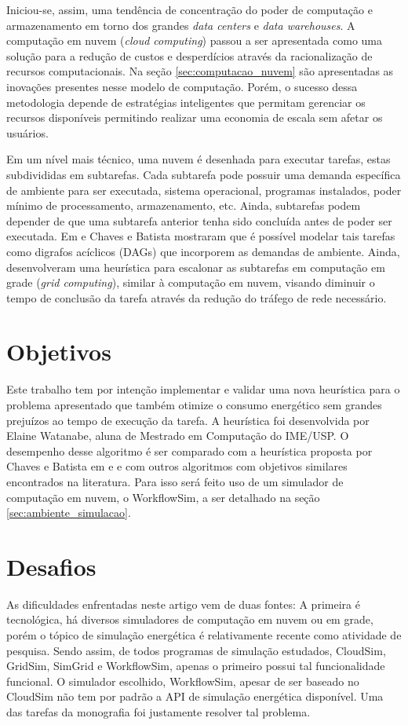 Iniciou-se, assim, uma tendência de concentração do poder de computação e 
armazenamento em torno dos grandes \emph{data centers} e \emph{data warehouses}.
A computação em nuvem (\emph{cloud computing}) passou a ser apresentada como
uma solução para a redução de custos e desperdícios através da
racionalização de recursos computacionais. Na seção \ref{sec:computacao_nuvem}
são apresentadas as inovações presentes nesse modelo de computação. Porém, o 
sucesso dessa metodologia depende de estratégias inteligentes que permitam 
gerenciar os recursos disponíveis permitindo realizar uma economia de escala
sem afetar os usuários.

Em um nível mais técnico, uma nuvem é desenhada para executar tarefas, estas
subdivididas em subtarefas. Cada subtarefa pode possuir uma demanda específica
de ambiente para ser executada, sistema operacional, programas instalados, poder
mínimo de processamento, armazenamento, etc. Ainda, subtarefas podem depender de
que uma subtarefa anterior tenha sido concluída antes de poder ser executada. Em
\cite{chaves:scheduling_software_requirements} e 
\cite{batista:embedding_software_requirements} Chaves e Batista mostraram que é 
possível modelar tais tarefas como digrafos acíclicos (DAGs) que incorporem as
demandas de ambiente. Ainda, desenvolveram uma heurística para escalonar as
subtarefas em computação em grade (\emph{grid computing}), similar à computação
em nuvem, visando diminuir o tempo de conclusão da tarefa através da redução
do tráfego de rede necessário.


\section{Objetivos}
\label{sec:objetivos}
Este trabalho tem por intenção implementar e validar uma nova heurística para o
problema apresentado que também otimize o consumo energético sem grandes prejuízos
ao tempo de execução da tarefa. A heurística foi desenvolvida por Elaine Watanabe, 
aluna de Mestrado em Computação do IME/USP. O desempenho desse algoritmo é
ser comparado com a heurística proposta por Chaves e Batista em
\cite{chaves:scheduling_software_requirements} e
\cite{batista:embedding_software_requirements} e com outros algoritmos com
objetivos similares encontrados na literatura. Para isso será feito uso de um
simulador de computação em nuvem, o WorkflowSim, a ser detalhado na seção
\ref{sec:ambiente_simulacao}.


\section{Desafios}
\label{sec:desafios}
As dificuldades enfrentadas neste artigo vem de duas fontes: A primeira é
tecnológica, há diversos simuladores de computação em nuvem ou em grade, porém
o tópico de simulação energética é relativamente recente como atividade de 
pesquisa. Sendo assim, de todos programas de simulação estudados, CloudSim, 
GridSim, SimGrid e WorkflowSim, apenas o primeiro possui tal funcionalidade
funcional. O simulador escolhido, WorkflowSim, apesar de ser baseado no CloudSim 
não tem por padrão a API de simulação energética disponível. Uma das tarefas da
monografia foi justamente resolver tal problema.

